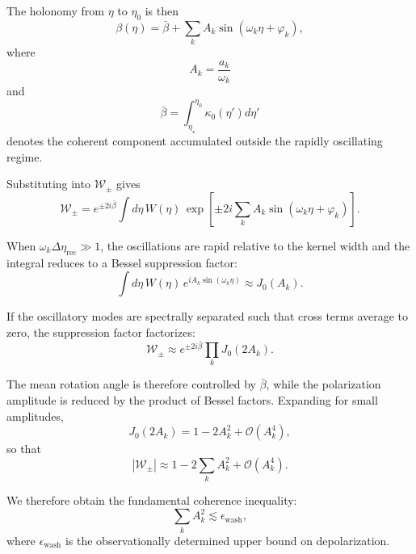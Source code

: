 \documentclass[12pt]{article}
\begin{document}
The holonomy from $\eta$ to $\eta_0$ is then
\begin{equation}
\beta(\eta)
=
\bar{\beta}
+
\sum_k
A_k
\sin(\omega_k \eta + \varphi_k),
\end{equation}
where
\begin{equation}
A_k = \frac{a_k}{\omega_k}
\end{equation}
and
\begin{equation}
\bar{\beta}
=
\int_{\eta_\star}^{\eta_0}
\kappa_0(\eta') d\eta'
\end{equation}
denotes the coherent component accumulated outside the rapidly oscillating regime.

Substituting into $\mathcal{W}_\pm$ gives
\begin{equation}
\mathcal{W}_\pm
=
e^{\pm 2 i \bar{\beta}}
\int d\eta \,
W(\eta)
\,
\exp
\left[
\pm 2 i
\sum_k
A_k
\sin(\omega_k \eta + \varphi_k)
\right].
\end{equation}

When $\omega_k \Delta\eta_{\mathrm{rec}} \gg 1$, the oscillations are rapid relative to the kernel width and the integral reduces to a Bessel suppression factor:
\begin{equation}
\int d\eta \,
W(\eta)
\, e^{i A_k \sin(\omega_k \eta)}
\approx
J_0(A_k).
\end{equation}

If the oscillatory modes are spectrally separated such that cross terms average to zero, the suppression factor factorizes:
\begin{equation}
\mathcal{W}_\pm
\approx
e^{\pm 2 i \bar{\beta}}
\prod_k
J_0(2 A_k).
\end{equation}

The mean rotation angle is therefore controlled by $\bar{\beta}$, while the polarization amplitude is reduced by the product of Bessel factors. Expanding for small amplitudes,
\begin{equation}
J_0(2 A_k)
=
1 - 2 A_k^2 + \mathcal{O}(A_k^4),
\end{equation}
so that
\begin{equation}
\left|\mathcal{W}_\pm\right|
\approx
1 - 2 \sum_k A_k^2 + \mathcal{O}(A_k^4).
\end{equation}

We therefore obtain the fundamental coherence inequality:
\begin{equation}
\sum_k A_k^2
\lesssim
\epsilon_{\mathrm{wash}},
\end{equation}
where $\epsilon_{\mathrm{wash}}$ is the observationally determined upper bound on depolarization.
\end{document}
